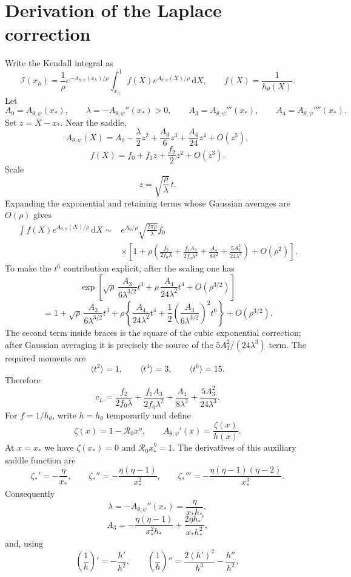 \documentclass[11pt]{article}
\newcommand{\Rzero}{\mathcal R_0}
\newcommand{\hth}{h_\theta}
\newcommand{\Apsi}{A_{\theta,\psi}}
\newcommand{\xs}{x_*}
\newcommand{\dd}{\,\mathrm{d}}
\begin{document}
\section{Derivation of the Laplace correction}
\label{sec:laplacedetail}

Write the Kendall integral as
\[
\mathcal I(x_h)
=\frac1\rho e^{-\Apsi(x_h)/\rho}
\int_{x_h}^{1}f(X)e^{\Apsi(X)/\rho}\dd X,
\qquad
f(X)=\frac1{\hth(X)}.
\]
Let
\[
A_0=\Apsi(\xs),
\qquad
\lambda=-\Apsi''(\xs)>0,
\qquad
A_3=\Apsi'''(\xs),
\qquad
A_4=\Apsi''''(\xs).
\]
Set $z=X-\xs$. Near the saddle,
\[
\Apsi(X)
=A_0-\frac\lambda2z^2+\frac{A_3}{6}z^3+\frac{A_4}{24}z^4+O(z^5),
\]
\[
f(X)=f_0+f_1z+\frac{f_2}{2}z^2+O(z^3).
\]
Scale
\[
z=\sqrt{\frac\rho\lambda}\,t.
\]
Expanding the exponential and retaining terms whose Gaussian averages are $O(\rho)$ gives
\[
\begin{aligned}
\int f(X)e^{\Apsi(X)/\rho}\dd X
\sim{}&e^{A_0/\rho}\sqrt{\frac{2\pi\rho}{\lambda}}f_0\\
&\times\left[
1+\rho\left(
\frac{f_2}{2f_0\lambda}
+\frac{f_1A_3}{2f_0\lambda^2}
+\frac{A_4}{8\lambda^2}
+\frac{5A_3^2}{24\lambda^3}
\right)
+O(\rho^2)
\right].
\end{aligned}
\]
To make the $t^6$ contribution explicit, after the scaling one has
\[
\exp\left[
\sqrt\rho\,\frac{A_3}{6\lambda^{3/2}}t^3
+\rho\,\frac{A_4}{24\lambda^2}t^4
+O(\rho^{3/2})
\right]
\]
\[
=1
+\sqrt\rho\,\frac{A_3}{6\lambda^{3/2}}t^3
+\rho\left
\{
\frac{A_4}{24\lambda^2}t^4
+\frac12\left(\frac{A_3}{6\lambda^{3/2}}\right)^2t^6
\right\}
+O(\rho^{3/2}).
\]
The second term inside braces is the square of the cubic exponential correction; after Gaussian averaging it is precisely the source of the $5A_3^2/(24\lambda^3)$ term.  The required moments are
\[
\langle t^2\rangle=1,
\qquad
\langle t^4\rangle=3,
\qquad
\langle t^6\rangle=15.
\]
Therefore
\[
\boxed{
 c_L
=
\frac{f_2}{2f_0\lambda}
+\frac{f_1A_3}{2f_0\lambda^2}
+\frac{A_4}{8\lambda^2}
+\frac{5A_3^2}{24\lambda^3}.
}
\]
For $f=1/h_\theta$, write $h=h_\theta$ temporarily and define
\[
\zeta(x)=1-\Rzero x^\eta,
\qquad
\Apsi'(x)=\frac{\zeta(x)}{h(x)}.
\]
At $x=\xs$ we have $\zeta(\xs)=0$ and $\Rzero\xs^\eta=1$. The derivatives of this auxiliary saddle function are
\[
\zeta_*'=-\frac{\eta}{\xs},
\qquad
\zeta_*''=-\frac{\eta(\eta-1)}{\xs^2},
\qquad
\zeta_*'''=-\frac{\eta(\eta-1)(\eta-2)}{\xs^3}.
\]
Consequently
\[
\lambda=-\Apsi''(\xs)=\frac{\eta}{\xs h_*},
\]
\[
A_3
=-\frac{\eta(\eta-1)}{\xs^2h_*}
+\frac{2\eta h_*'}{\xs h_*^2},
\]
and, using
\[
\left(\frac1h\right)'=-\frac{h'}{h^2},
\qquad
\left(\frac1h\right)''=\frac{2(h')^2}{h^3}-\frac{h''}{h^2},
\]
\end{document}

